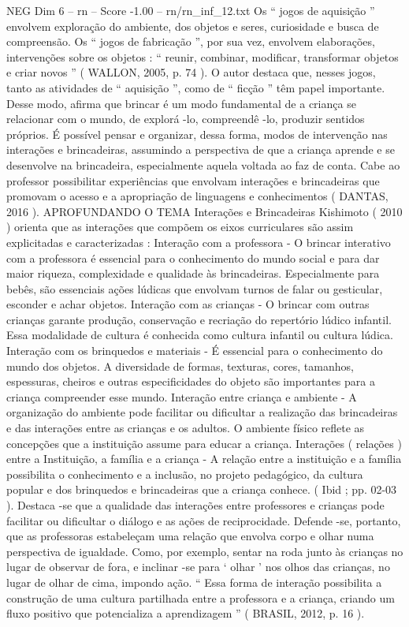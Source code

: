 \begin{textsample}{NEG Dim 6 – rn – Score -1.00 – rn/rn\_inf\_12.txt}
Os “ jogos de aquisição ” envolvem exploração do ambiente, dos objetos e seres, curiosidade e busca de compreensão.
Os “ jogos de fabricação ”, por sua vez, envolvem elaborações, intervenções sobre os objetos : “ reunir, combinar, modificar, transformar objetos e criar novos ” ( WALLON, 2005, p. 74 ).
O autor destaca que, nesses jogos, tanto as atividades de “ aquisição ”, como de “ ficção ” têm papel importante.
Desse modo, afirma que brincar é um modo fundamental de a criança se relacionar com o mundo, de explorá -lo, compreendê -lo, produzir sentidos próprios.
É possível pensar e organizar, dessa forma, modos de intervenção nas interações e brincadeiras, assumindo a perspectiva de que a criança aprende e se desenvolve na brincadeira, especialmente aquela voltada ao faz de conta.
Cabe ao professor possibilitar experiências que envolvam interações e brincadeiras que promovam o acesso e a apropriação de linguagens e conhecimentos ( DANTAS, 2016 ).
APROFUNDANDO O TEMA Interações e Brincadeiras Kishimoto ( 2010 ) orienta que as interações que compõem os eixos curriculares são assim explicitadas e caracterizadas : Interação com a professora - O brincar interativo com a professora é essencial para o conhecimento do mundo social e para dar maior riqueza, complexidade e qualidade às brincadeiras.
Especialmente para bebês, são essenciais ações lúdicas que envolvam turnos de falar ou gesticular, esconder e achar objetos.
Interação com as crianças - O brincar com outras crianças garante produção, conservação e recriação do repertório lúdico infantil.
Essa modalidade de cultura é conhecida como cultura infantil ou cultura lúdica.
Interação com os brinquedos e materiais - É essencial para o conhecimento do mundo dos objetos.
A diversidade de formas, texturas, cores, tamanhos, espessuras, cheiros e outras especificidades do objeto são importantes para a criança compreender esse mundo.
Interação entre criança e ambiente - A organização do ambiente pode facilitar ou dificultar a realização das brincadeiras e das interações entre as crianças e os adultos.
O ambiente físico reflete as concepções que a instituição assume para educar a criança.
Interações ( relações ) entre a Instituição, a família e a criança - A relação entre a instituição e a família possibilita o conhecimento e a inclusão, no projeto pedagógico, da cultura popular e dos brinquedos e brincadeiras que a criança conhece. ( Ibid ; pp. 02-03 ).
Destaca -se que a qualidade das interações entre professores e crianças pode facilitar ou dificultar o diálogo e as ações de reciprocidade.
Defende -se, portanto, que as professoras estabeleçam uma relação que envolva corpo e olhar numa perspectiva de igualdade.
Como, por exemplo, sentar na roda junto às crianças no lugar de observar de fora, e inclinar -se para ‘ olhar ’ nos olhos das crianças, no lugar de olhar de cima, impondo ação. “ Essa forma de interação possibilita a construção de uma cultura partilhada entre a professora e a criança, criando um fluxo positivo que potencializa a aprendizagem ” ( BRASIL, 2012, p. 16 ).

\end{textsample}
